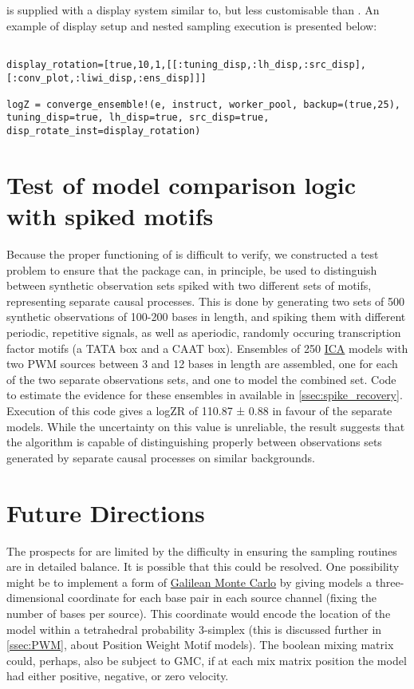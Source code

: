  is supplied with a display system similar to, but less customisable than . An example of display setup and nested sampling execution is presented below:

\begin{verbatim}

display_rotation=[true,10,1,[[:tuning_disp,:lh_disp,:src_disp],[:conv_plot,:liwi_disp,:ens_disp]]]

logZ = converge_ensemble!(e, instruct, worker_pool, backup=(true,25), tuning_disp=true, lh_disp=true, src_disp=true, disp_rotate_inst=display_rotation)
\end{verbatim}

\section{Test of model comparison logic with spiked motifs}
Because the proper functioning of  is difficult to verify, we constructed a test problem to ensure that the package can, in principle, be used to distinguish between synthetic observation sets spiked with two different sets of motifs, representing separate causal processes. This is done by generating two sets of 500 synthetic observations of 100-200 bases in length, and spiking them with different periodic, repetitive signals, as well as aperiodic, randomly occuring transcription factor motifs (a TATA box and a CAAT box). Ensembles of 250 \hyperref[ssec:ICA]{ICA} models with two PWM sources between 3 and 12 bases in length are assembled, one for each of the two separate observations sets, and one to model the combined set. Code to estimate the evidence for these ensembles in available in \autoref{ssec:spike_recovery}. Execution of this code gives a logZR of 110.87 ± 0.88 in favour of the separate models. While the uncertainty on this value is unreliable, the result suggests that the algorithm is capable of distinguishing properly between observations sets generated by separate causal processes on similar backgrounds.

\section{Future Directions}
The prospects for  are limited by the difficulty in ensuring the sampling routines are in detailed balance. It is possible that this could be resolved. One possibility might be to implement a form of \hyperref[ssec:GMC]{Galilean Monte Carlo} by giving models a three-dimensional coordinate for each base pair in each source channel (fixing the number of bases per source). This coordinate would encode the location of the model within a tetrahedral probability 3-simplex (this is discussed further in \autoref{ssec:PWM}, about Position Weight Motif models). The boolean mixing matrix could, perhaps, also be subject to GMC, if at each mix matrix position the model had either positive, negative, or zero velocity.

